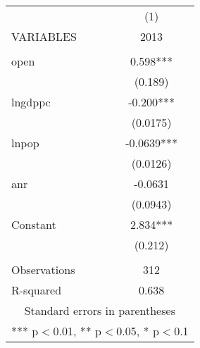 \documentclass[]{article}
\begin{document}
\begin{tabular}{lc} \hline
 & (1) \\
VARIABLES & 2013 \\ \hline
 &  \\
open & 0.598*** \\
 & (0.189) \\
lngdppc & -0.200*** \\
 & (0.0175) \\
lnpop & -0.0639*** \\
 & (0.0126) \\
anr & -0.0631 \\
 & (0.0943) \\
Constant & 2.834*** \\
 & (0.212) \\
 &  \\
Observations & 312 \\
 R-squared & 0.638 \\ \hline
\multicolumn{2}{c}{ Standard errors in parentheses} \\
\multicolumn{2}{c}{ *** p$<$0.01, ** p$<$0.05, * p$<$0.1} \\
\end{tabular}
\end{document}
